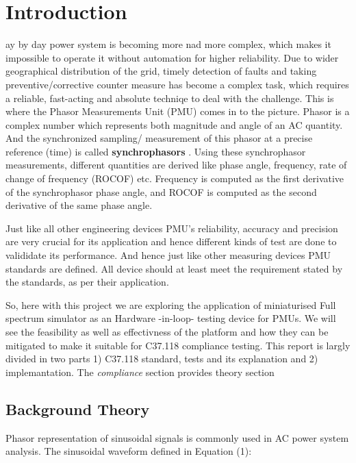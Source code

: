 \section{Introduction}
ay by day power system is becoming more nad more complex, which makes it impossible to operate it without automation for higher reliability. Due to wider geographical distribution of the grid, timely detection of faults and taking preventive/corrective counter measure  has become a complex task, which requires a reliable, fast-acting and absolute techniqe to deal with the challenge. This is where the Phasor Measurements Unit (PMU) comes in to the picture. Phasor is a complex number which represents both magnitude and angle of an AC quantity. And the synchronized sampling/ measurement of this phasor at a precise reference (time) is called \textbf{synchrophasors} \cite{std:c37}. Using these synchrophasor measurements, different quantities are derived like phase angle, frequency, rate of change of frequency (ROCOF) etc. Frequency is computed as the first derivative of the synchrophasor phase angle, and ROCOF is computed as the second derivative of the same phase angle. 

Just like all other engineering devices PMU's reliability, accuracy  and precision are very crucial for its application and hence different kinds of test are done to valididate its performance. And hence just like other measuring devices PMU standards are defined. All device should at least meet the requirement stated by the standards, as per their application. 

So, here with this project we are exploring the application of miniaturised Full spectrum simulator as an Hardware -in-loop- testing device for PMUs. We will see the feasibility as well as effectivness of the platform and how they can be mitigated to make it suitable for C37.118 compliance testing. This report is largly divided in two parts 1) C37.118 standard, tests and its explanation and 2) implemantation. The \textit{compliance} section provides theory section 

\subsection{Background Theory}
Phasor representation of sinusoidal signals is commonly used in AC power system analysis. The sinusoidal waveform defined in Equation (1):

